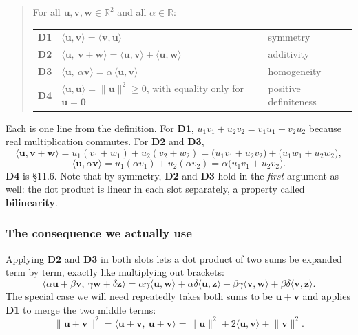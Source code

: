 \documentclass[11pt]{article}
\theoremstyle{definition}
\theoremstyle{remark}
\newcommand{\R}{\mathbb{R}}
\newcommand{\vc}[1]{\mathbf{#1}}
\newcommand{\norm}[1]{\lVert #1\rVert}
\begin{document}
\begin{quote}
For all $\vc{u},\vc{v},\vc{w}\in\R^{2}$ and all $\alpha\in\R$:

\smallskip
\renewcommand{\arraystretch}{1.5}
\begin{tabular}{@{}l l l@{}}
\textbf{D1} & $\langle\vc{u},\vc{v}\rangle = \langle\vc{v},\vc{u}\rangle$
            & symmetry \\
\textbf{D2} & $\langle\vc{u},\ \vc{v}+\vc{w}\rangle
              = \langle\vc{u},\vc{v}\rangle+\langle\vc{u},\vc{w}\rangle$
            & additivity \\
\textbf{D3} & $\langle\vc{u},\ \alpha\vc{v}\rangle
              = \alpha\,\langle\vc{u},\vc{v}\rangle$
            & homogeneity \\
\textbf{D4} & $\langle\vc{u},\vc{u}\rangle = \norm{\vc{u}}^{2} \ge 0$,
              with equality only for $\vc{u}=\vc{0}$
            & positive definiteness \\
\end{tabular}
\end{quote}

\noindent Each is one line from the definition. For \textbf{D1},
$u_1v_1+u_2v_2 = v_1u_1+v_2u_2$ because real multiplication commutes. For
\textbf{D2} and \textbf{D3},
\[
  \langle\vc{u},\vc{v}+\vc{w}\rangle
  = u_1(v_1+w_1)+u_2(v_2+w_2)
  = \bigl(u_1v_1+u_2v_2\bigr)+\bigl(u_1w_1+u_2w_2\bigr) ,
\]
\[
  \langle\vc{u},\alpha\vc{v}\rangle
  = u_1(\alpha v_1)+u_2(\alpha v_2)
  = \alpha\bigl(u_1v_1+u_2v_2\bigr) .
\]
\textbf{D4} is \S11.6. Note that by symmetry, \textbf{D2} and \textbf{D3} hold
in the \emph{first} argument as well: the dot product is linear in each slot
separately, a property called \textbf{bilinearity}.

\subsubsection*{The consequence we actually use}
Applying \textbf{D2} and \textbf{D3} in both slots lets a dot product of two
sums be expanded term by term, exactly like multiplying out brackets:
\[
  \bigl\langle \alpha\vc{u}+\beta\vc{v},\ \gamma\vc{w}+\delta\vc{z}\bigr\rangle
  = \alpha\gamma\langle\vc{u},\vc{w}\rangle
  + \alpha\delta\langle\vc{u},\vc{z}\rangle
  + \beta\gamma\langle\vc{v},\vc{w}\rangle
  + \beta\delta\langle\vc{v},\vc{z}\rangle .
\]
The special case we will need repeatedly takes both sums to be
$\vc{u}+\vc{v}$ and applies \textbf{D1} to merge the two middle terms:
\[
  \norm{\vc{u}+\vc{v}}^{2}
  = \langle\vc{u}+\vc{v},\ \vc{u}+\vc{v}\rangle
  = \norm{\vc{u}}^{2} + 2\langle\vc{u},\vc{v}\rangle + \norm{\vc{v}}^{2} .
\]
\end{document}
